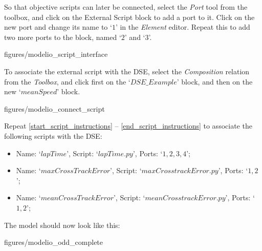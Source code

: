\documentclass[11pt,a4paper]{../tutorial}
\begin{document}
\begin{instructions}
\item So that objective scripts can later be connected, select the \emph{Port} tool from the toolbox, and click on the External Script block to add a port to it. Click on the new port and change its name to `$1$' in the \emph{Element} editor. Repeat this to add two more ports to the block, named `$2$' and `$3$'.

\begin{center}
\begin{annotation}[width=0.7\linewidth]{figures/modelio_script_interface}
    \end{annotation}
\end{center}


\item \label{end_script_instructions}To associate the external script with the DSE, select the \emph{Composition} relation from the \emph{Toolbox}, and click first on the `$DSE\_Example$' block, and then on the new `$meanSpeed$' block.

\begin{center}
\begin{annotation}[width=0.7\linewidth]{figures/modelio_connect_script}
    \end{annotation}
\end{center}

\newpage

\item Repeat \ref{start_script_instructions} -- \ref{end_script_instructions} to associate the following scripts with the DSE:
\begin{itemize}
	\item Name: `$lapTime$', Script: `$lapTime.py$', Ports: `$1,2,3,4$';
	\item Name: `$maxCrossTrackError$', Script: `$maxCrosstrackError.py$', Ports: `$1,2$';
	\item Name: `$meanCrossTrackError$', Script: `$meanCrosstrackError.py$', Ports: `$1,2$';
\end{itemize}

The model should now look like this:

\begin{center}
\begin{annotation}[width=0.7\linewidth]{figures/modelio_odd_complete}
    \end{annotation}
\end{center}


\end{instructions}
\end{document}
